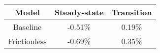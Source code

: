 {\fontshape\scdefault\selectfont 
\centering{} 
\begin{tabular}{ccc} 
\hline\hline 
Model & Steady-state  & Transition \\ 
\hline 
Baseline &-0.51\%&0.19\%\\ 
Frictionless &-0.69\%&0.35\%\\ 
\hline\hline 
\end{tabular} 
} 
